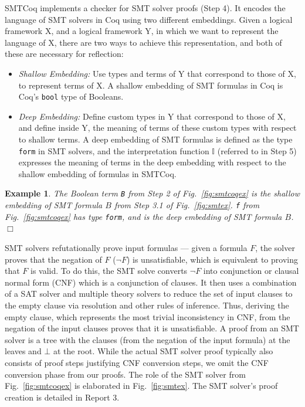 \documentclass{article}
\newtheorem{example}{Example}[section]
\begin{document}
	SMTCoq implements a checker for 
	SMT solver proofs (Step 4). It 
	encodes the language of SMT solvers
	in Coq using two different embeddings. 
	Given a logical framework X, and 
	a logical framework Y, in which we 
	want to represent the language of X, 
	there are two ways to achieve this
	representation, and 
	both of these are necessary for 
	reflection:
	\begin{itemize}
		\item \textit{Shallow Embedding: }
		Use types and terms of Y that 
		correspond to those of X, to 
		represent terms of X. A shallow
		embedding of SMT formulas in 
		Coq is Coq's \texttt{bool} 
		type of Booleans. 
		\item\textit{Deep Embedding: }
		Define custom types in Y that 
		correspond to those of X, and 
		define inside Y, the meaning of 
		terms of these custom types with 
		respect to shallow terms. A 
		deep embedding of SMT formulas 
		is defined as the type 
		\texttt{form} in SMT solvers, 
		and the interpretation function 
		$\mathbb{I}$ (referred to in 
		Step 5) expresses the meaning 
		of terms in the deep embedding 
		with respect to the shallow 
		embedding of formulas in SMTCoq.
	\end{itemize}
	
	\begin{example} 
		\em The Boolean 
		term \texttt{B} from Step 2 of 
		Fig.~\ref{fig:smtcoqex}
		is the shallow embedding of SMT 
		formula $B$ from Step 3.1 of 
		Fig.~\ref{fig:smtex}.
		\texttt{f} from 
		Fig.~\ref{fig:smtcoqex} has
		type \texttt{form}, and is 
		the deep embedding of 
		SMT formula $B$. \hfill $\Box$
	\end{example}

	SMT solvers refutationally prove 
	input formulas --- given a formula
	$F$, the solver proves that the 
	negation of $F$ ($\neg F$) is 
	unsatisfiable, which is equivalent
	to proving that $F$ is valid. 
	To do this, the SMT solve converts 
	$\neg F$ into conjunction or clausal 
	normal form (CNF) which is a 
	conjunction of clauses. It then uses 
	a combination of a SAT solver and 
	multiple theory	solvers to reduce 
	the set of input clauses to the 
	empty clause via resolution
	and other rules of inference. Thus,
	deriving the empty clause, which 
	represents the most trivial
	inconsistency in CNF, from the 
	negation of the input clauses proves 
	that it is unsatisfiable. A proof
	from an SMT solver is a tree 
	with the clauses (from the 
	negation of the input formula) at
	the leaves and $\bot$
	at the root. While the actual SMT 
	solver proof typically also consists 
	of proof steps justifying CNF 
	conversion steps, we omit the 
	CNF conversion phase from our proofs.
	The role of the SMT
	solver from Fig.~\ref{fig:smtcoqex}
	is elaborated in Fig.~\ref{fig:smtex}.
	The SMT solver's proof creation is 
	detailed in Report 3.
	
\end{document}
